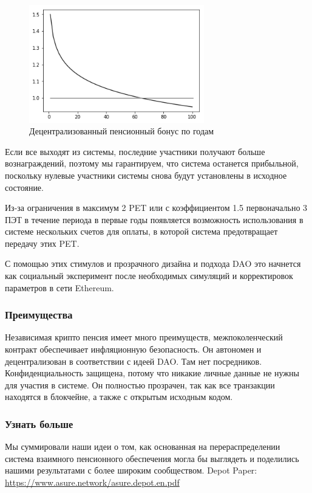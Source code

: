 \begin{figure}[H]
    \centering
    \includegraphics[width=3.0in]{img/pension_bonus.png}
    \caption{Децентрализованный пенсионный бонус по годам}
    \label{fig:pension_bonus}
\end{figure}

Если все выходят из системы, последние участники получают больше вознаграждений, поэтому мы гарантируем, что система останется прибыльной, поскольку нулевые участники системы снова будут установлены в исходное состояние.

Из-за ограничения в максимум 2 PET или с коэффициентом 1.5 первоначально 3 ПЭТ в течение периода в первые годы появляется возможность использования в системе нескольких счетов для оплаты, в которой система предотвращает передачу этих PET. 

С помощью этих стимулов и прозрачного дизайна и подхода DAO это начнется как социальный эксперимент после необходимых симуляций и корректировок параметров в сети Ethereum.

\subsubsection*{Преимущества}
Независимая крипто пенсия имеет много преимуществ, межпоколенческий контракт обеспечивает инфляционную безопасность. Он автономен и децентрализован в соответствии с идеей DAO. Там нет посредников. Конфиденциальность защищена, потому что никакие личные данные не нужны для участия в системе. Он полностью прозрачен, так как все транзакции находятся в блокчейне, а также с открытым исходным кодом.

\subsubsection*{Узнать больше}
Мы суммировали наши идеи о том, как основанная на перераспределении система взаимного пенсионного обеспечения могла бы выглядеть и поделились нашими результатами с более широким сообществом.
\newline
Depot Paper: \url{https://www.asure.network/asure.depot.en.pdf}

